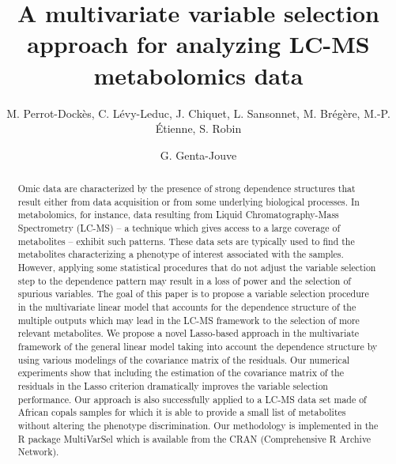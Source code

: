 \documentclass[11pt,a4paper,reqno]{amsart}
\begin{document}
\title[A multivariate variable selection approach for LC-MS metabolomics data]{A multivariate variable selection approach for analyzing LC-MS metabolomics data}

\author[M. Perrot-Dock\`es, C. L\'evy-Leduc, J. Chiquet et al.]{M. Perrot-Dock\`es, C. L\'evy-Leduc, J. Chiquet, L.  Sansonnet, 
M. Br\'eg\`ere, M.-P. \'Etienne, S. Robin}
\address{UMR MIA-Paris, AgroParisTech, INRA, Universit\'e 
Paris-Saclay, 75005, Paris, France}
\author[]{G. Genta-Jouve}
\address{UMR CNRS 8638 Com\`ete - Universit\'e Paris-Descartes, CNRS, 75006 Paris France.}



\begin{abstract} Omic data are characterized by the
    presence of  strong dependence structures that  result either from
    data  acquisition or  from  some underlying  biological
    processes.   In metabolomics,  for  instance,  data resulting  from
    Liquid  Chromatography-Mass Spectrometry  (LC-MS)  -- a  technique
    which gives access  to a large coverage of  metabolites -- exhibit
    such  patterns.   These  data sets  are   typically  used  to  find  the
    metabolites characterizing a phenotype of interest associated with
    the samples. However, applying
    some  statistical  procedures that  do  not  adjust the variable selection
    step to  the dependence pattern may result  in a loss
    of power  and the selection  of spurious variables.  The  goal of
  this  paper is  to propose  a  variable selection  procedure in  the
  multivariate linear model that accounts for the dependence structure
  of  the multiple  outputs which may lead in the LC-MS framework to the selection
 of more relevant metabolites.
    We propose  a novel  Lasso-based approach  in the
  multivariate  framework  of the  general  linear  model taking  into
  account the dependence structure by  using various modelings of the
  covariance matrix  of the residuals. Our  numerical experiments show
  that  including  the estimation  of  the  covariance matrix  of  the
  residuals in the Lasso  criterion dramatically improves the variable
  selection performance. Our approach  is also successfully applied to
  a LC-MS data set made of African  copals samples for which it is able
  to provide a small list of metabolites without altering the
  phenotype discrimination.
   Our methodology is implemented in the R package \textsf{MultiVarSel}
which is available from the CRAN (Comprehensive R Archive Network).
\end{abstract}
\end{document}
